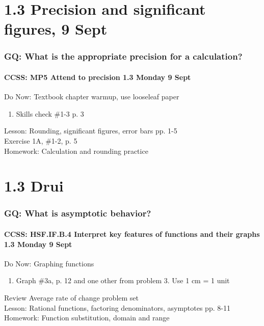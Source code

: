 \documentclass{beamer}
\begin{document}
  \section{1.3 Precision and significant figures, 9 Sept}
  \frame
  {
    \frametitle{GQ: What is the appropriate precision for a calculation?}
    \framesubtitle{CCSS: MP5 Attend to precision \hfill \alert{1.3 Monday 9 Sept}}

    \begin{block}{Do Now: Textbook chapter warmup, use looseleaf paper}
    \begin{enumerate}
        \item Skills check \#1-3 p. 3
    \end{enumerate}
    \end{block}
    Lesson: Rounding, significant figures, error bars pp. 1-5\\
    Exercise 1A, \#1-2, p. 5
    \\[0.5cm]
    Homework: Calculation and rounding practice
  }

  \section{1.3 Drui}
  \frame
  {
    \frametitle{GQ: What is asymptotic behavior?}
    \framesubtitle{CCSS: HSF.IF.B.4 Interpret key features of functions and their graphs \hfill \alert{1.3 Monday 9 Sept}}

    \begin{block}{Do Now: Graphing functions}
    \begin{enumerate}
        \item Graph \#3a, p. 12 and one other from problem 3. Use 1 cm = 1 unit
    \end{enumerate}
    \end{block}
    Review Average rate of change problem set\\ \bigskip
    Lesson: Rational functions, factoring denominators, asymptotes pp. 8-11
    \\%
    Homework: Function substitution, domain and range
  }
\end{document}

